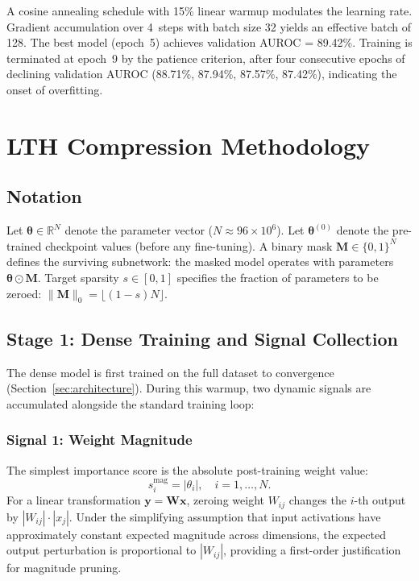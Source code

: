 \documentclass[journal]{IEEEtran}
\begin{document}
A cosine annealing schedule with 15\% linear warmup modulates
the learning rate.
Gradient accumulation over 4~steps with batch size 32 yields
an effective batch of 128.
The best model (epoch~5) achieves validation AUROC = 89.42\%.
Training is terminated at epoch~9 by the patience criterion,
after four consecutive epochs of declining validation AUROC
(88.71\%, 87.94\%, 87.57\%, 87.42\%), indicating the onset
of overfitting.


\section{LTH Compression Methodology}
\label{sec:method}

\subsection{Notation}

Let $\bm{\theta} \in \mathbb{R}^N$ denote the parameter vector
($N \approx 96 \times 10^6$).
Let $\bm{\theta}^{(0)}$ denote the pre-trained checkpoint values
(before any fine-tuning).
A binary mask $\bm{M} \in \{0,1\}^N$ defines the surviving
subnetwork: the masked model operates with parameters
$\bm{\theta} \odot \bm{M}$.
Target sparsity $s \in [0,1]$ specifies the fraction of
parameters to be zeroed:
$\|\bm{M}\|_0 = \lfloor(1-s)N\rfloor$.

\subsection{Stage 1: Dense Training and Signal Collection}

The dense model is first trained on the full dataset to
convergence (Section~\ref{sec:architecture}).
During this warmup, two dynamic signals are accumulated
alongside the standard training loop:

\subsubsection{Signal 1: Weight Magnitude}

The simplest importance score is the absolute post-training
weight value:
\begin{equation}
  s_i^{\text{mag}} = |\theta_i|, \quad i = 1,\ldots,N.
  \label{eq:mag}
\end{equation}
For a linear transformation $\mathbf{y} = \mathbf{W}\mathbf{x}$,
zeroing weight $W_{ij}$ changes the $i$-th output by
$|W_{ij}| \cdot |x_j|$.
Under the simplifying assumption that input activations have
approximately constant expected magnitude across dimensions,
the expected output perturbation is proportional to $|W_{ij}|$,
providing a first-order justification for magnitude pruning.
\end{document}
